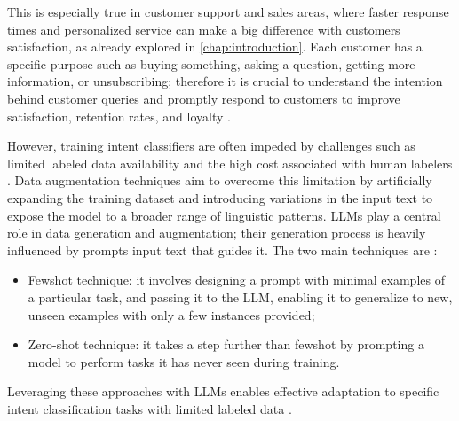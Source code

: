 \documentclass[12pt,a4paper,openright,twoside]{book}
\begin{document}
This is especially true in customer support and sales areas, where faster response
times and personalized service can make a big difference with customers satisfaction,
as already explored in \cref{chap:introduction}.
Each customer has a specific purpose such as buying something,
asking a question, getting more information, or unsubscribing;
therefore it is crucial to understand the intention behind customer queries and
promptly respond to customers to improve satisfaction, retention rates, and loyalty \cite{al2022intent}.

However, training intent classifiers are often impeded by challenges such as
limited labeled data availability and the high cost associated with human labelers \cite{benayas2024enhancing}.
Data augmentation techniques aim to overcome this limitation by artificially
expanding the training dataset and introducing variations in the input text to
expose the model to a broader range of linguistic patterns.
LLMs play a central role in data generation and augmentation;
their generation process is heavily influenced by prompts input text that guides it.
The two main techniques are \cite{benayas2024enhancing}:
\begin{itemize}
    \item Fewshot technique: it involves designing a prompt with minimal examples of
    a particular task, and passing it to the LLM, enabling it to generalize to new,
    unseen examples with only a few instances provided;
    \item Zero-shot technique: it takes a step further than fewshot by prompting
    a model to perform tasks it has never seen during training.
\end{itemize}

Leveraging these approaches with LLMs enables effective adaptation to specific intent
classification tasks with limited labeled data \cite{benayas2024enhancing}.
\end{document}
